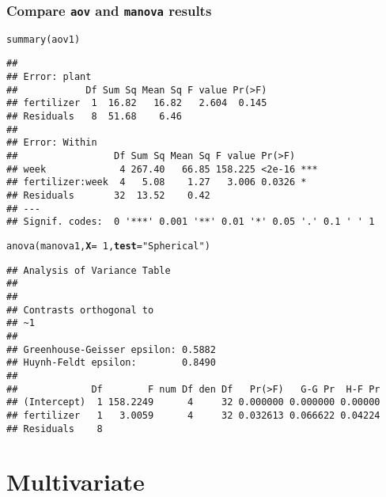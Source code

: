 \documentclass[color=usenames,dvipsnames]{beamer}\usepackage[]{graphicx}\usepackage[]{color}
\makeatletter
\newcommand{\hlnum}[1]{\textcolor[rgb]{0.69,0.494,0}{#1}}%
\newcommand{\hlstr}[1]{\textcolor[rgb]{0.749,0.012,0.012}{#1}}%
\newcommand{\hlopt}[1]{\textcolor[rgb]{0,0,0}{#1}}%
\newcommand{\hlstd}[1]{\textcolor[rgb]{0,0,0}{#1}}%
\newcommand{\hlkwc}[1]{\textcolor[rgb]{0,0,0}{\textbf{#1}}}%
\newcommand{\hlkwd}[1]{\textcolor[rgb]{0.004,0.004,0.506}{#1}}%
\newenvironment{kframe}{%
 \def\at@end@of@kframe{}%
 \ifinner\ifhmode%
  \def\at@end@of@kframe{\end{minipage}}%
  \begin{minipage}{\columnwidth}%
 \fi\fi%
 \def\FrameCommand##1{\hskip\@totalleftmargin \hskip-\fboxsep
 \colorbox{shadecolor}{##1}\hskip-\fboxsep
     \hskip-\linewidth \hskip-\@totalleftmargin \hskip\columnwidth}%
 \MakeFramed {\advance\hsize-\width
   \@totalleftmargin\z@ \linewidth\hsize
   \@setminipage}}%
 {\par\unskip\endMakeFramed%
 \at@end@of@kframe}
\newenvironment{knitrout}{}{} %
\makeatother
\begin{document}
\begin{frame}[fragile]
  \frametitle{Compare {\tt aov} and {\tt manova} results}
  \tiny
\begin{knitrout}\tiny
{}\color{fgcolor}\begin{kframe}
\begin{alltt}
\hlkwd{summary}\hlstd{(aov1)}
\end{alltt}
\begin{verbatim}
## 
## Error: plant
##            Df Sum Sq Mean Sq F value Pr(>F)
## fertilizer  1  16.82   16.82   2.604  0.145
## Residuals   8  51.68    6.46               
## 
## Error: Within
##                 Df Sum Sq Mean Sq F value Pr(>F)    
## week             4 267.40   66.85 158.225 <2e-16 ***
## fertilizer:week  4   5.08    1.27   3.006 0.0326 *  
## Residuals       32  13.52    0.42                   
## ---
## Signif. codes:  0 '***' 0.001 '**' 0.01 '*' 0.05 '.' 0.1 ' ' 1
\end{verbatim}
\end{kframe}
\end{knitrout}
\begin{knitrout}\tiny
{}\color{fgcolor}\begin{kframe}
\begin{alltt}
\hlkwd{anova}\hlstd{(manova1,} \hlkwc{X}\hlstd{=}\hlopt{~}\hlnum{1}\hlstd{,} \hlkwc{test}\hlstd{=}\hlstr{"Spherical"}\hlstd{)}
\end{alltt}
\begin{verbatim}
## Analysis of Variance Table
## 
## 
## Contrasts orthogonal to
## ~1
## 
## Greenhouse-Geisser epsilon: 0.5882
## Huynh-Feldt epsilon:        0.8490
## 
##             Df        F num Df den Df   Pr(>F)   G-G Pr  H-F Pr
## (Intercept)  1 158.2249      4     32 0.000000 0.000000 0.00000
## fertilizer   1   3.0059      4     32 0.032613 0.066622 0.04224
## Residuals    8
\end{verbatim}
\end{kframe}
\end{knitrout}
\end{frame}











\section{Multivariate}
\end{document}
